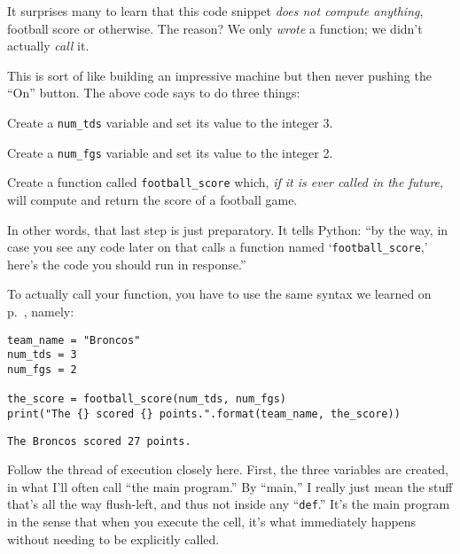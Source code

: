 It surprises many to learn that this code snippet \textit{does not compute
anything}, football score or otherwise. The reason? We only \textit{wrote} a
function; we didn't actually \textit{call} it.

This is sort of like building an impressive machine but then never pushing the
``On'' button. The above code says to do three things:

\begin{compactenum}
\item Create a \texttt{num\_tds} variable and set its value to the integer 3.
\item Create a \texttt{num\_fgs} variable and set its value to the integer 2.
\item Create a function called \texttt{football\_score} which, \textit{if it is
ever called in the future}, will compute and return the score of a football
game.
\end{compactenum}

In other words, that last step is just preparatory. It tells Python: ``by the
way, in case you see any code later on that calls a function named
`\texttt{football\_score},' here's the code you should run in response.''

To actually call your function, you have to use the same syntax we learned on
p.~\pageref{function}, namely:

\begin{Verbatim}[fontsize=\small,samepage=true,frame=single,framesep=3mm]
team_name = "Broncos"
num_tds = 3
num_fgs = 2

the_score = football_score(num_tds, num_fgs)
print("The {} scored {} points.".format(team_name, the_score))
\end{Verbatim}
\vspace{-.2in}

\begin{Verbatim}[fontsize=\small,samepage=true,frame=leftline,framesep=5mm,framerule=1mm]
The Broncos scored 27 points.
\end{Verbatim}


Follow the thread of execution closely here. First, the three variables are
created, in what I'll often call ``the main program.'' By ``main,'' I really
just mean the stuff that's all the way flush-left, and thus not inside any
``\texttt{def}.'' It's the main program in the sense that when you execute the
cell, it's what immediately happens without needing to be explicitly called.

